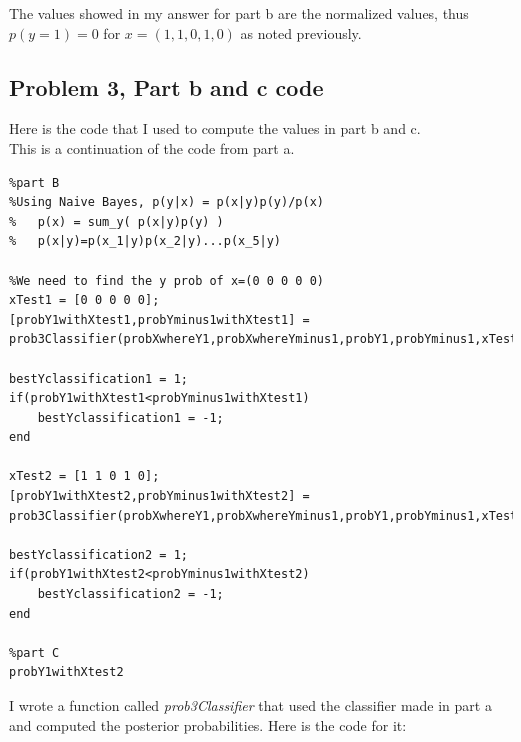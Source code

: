 \documentclass[11pt,psfig]{article}
\begin{document}
The values showed in my answer for part b are the normalized values, thus \\
$p(y=1)=0$ for $x=(1,1,0,1,0)$ as noted previously.

\subsection*{Problem 3, Part b and c code}

Here is the code that I used to compute the values in part b and c. \\
This is a continuation of the code from part a.

\begin{verbatim}
%part B
%Using Naive Bayes, p(y|x) = p(x|y)p(y)/p(x)
%   p(x) = sum_y( p(x|y)p(y) )
%   p(x|y)=p(x_1|y)p(x_2|y)...p(x_5|y)

%We need to find the y prob of x=(0 0 0 0 0)
xTest1 = [0 0 0 0 0];
[probY1withXtest1,probYminus1withXtest1] = prob3Classifier(probXwhereY1,probXwhereYminus1,probY1,probYminus1,xTest1);

bestYclassification1 = 1;
if(probY1withXtest1<probYminus1withXtest1)
    bestYclassification1 = -1; 
end

xTest2 = [1 1 0 1 0];
[probY1withXtest2,probYminus1withXtest2] = prob3Classifier(probXwhereY1,probXwhereYminus1,probY1,probYminus1,xTest2);

bestYclassification2 = 1;
if(probY1withXtest2<probYminus1withXtest2)
    bestYclassification2 = -1; 
end

%part C
probY1withXtest2
\end{verbatim}

\newpage

I wrote a function called {\it prob3Classifier} that used the classifier made in part a \\
and computed the posterior probabilities. Here is the code for it:
\end{document}
